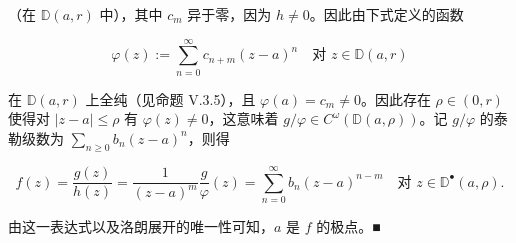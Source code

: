 \begin{proposition}
\begin{items}
（在 $ \mathbb{D}(a,r) $ 中），其中 $ c_{m} $ 异于零，因为 $ h \ne 0 $。因此由下式定义的函数

\[
\varphi(z) := \sum_{n=0}^{\infty}c_{n+m}(z - a)^{n} \quad \text{对 } z \in \mathbb{D}(a,r)
\]

在 $ \mathbb{D}(a,r) $ 上全纯（见命题 V.3.5），且 $ \varphi(a) = c_{m} \ne 0 $。因此存在 $ \rho \in (0,r) $ 使得对 $ |z - a| \le \rho $ 有 $ \varphi(z) \ne 0 $，这意味着 $ g/\varphi \in C^{\omega}\left(\mathbb{D}(a,\rho)\right) $。记 $ g/\varphi $ 的泰勒级数为 $ \sum_{n\ge 0}b_{n}(z - a)^{n} $，则得

\[
f(z) = \frac{g(z)}{h(z)} = \frac{1}{(z - a)^{m}}\frac{g}{\varphi}(z) = \sum_{n=0}^{\infty}b_{n}(z - a)^{n-m} \quad \text{对 } z \in \mathbb{D}^{\bullet}(a,\rho) .
\]

由这一表达式以及洛朗展开的唯一性可知，$ a $ 是 $ f $ 的极点。\nobreak\hspace{0.35em}■

\end{items}

\end{proposition}

